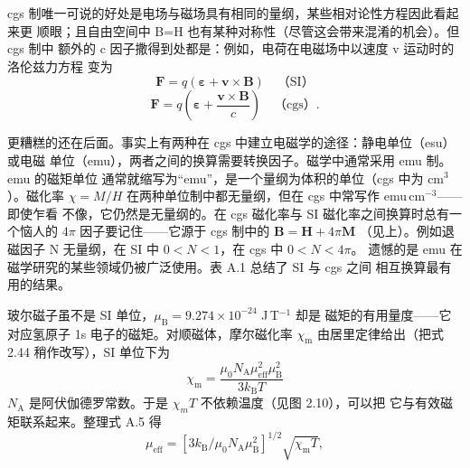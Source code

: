cgs 制唯一可说的好处是电场与磁场具有相同的量纲，某些相对论性方程因此看起来更
顺眼；且自由空间中 B=H 也有某种对称性（尽管这会带来混淆的机会）。但 cgs 制中
额外的 c 因子撒得到处都是：例如，电荷在电磁场中以速度 v 运动时的洛伦兹力方程
变为
\begin{equation*}
\mathbf{F} = q(\boldsymbol{\varepsilon} + \mathbf{v}\times\mathbf{B}) \quad\text{（SI）}
\end{equation*}
\begin{equation*}
\mathbf{F} = q\left(\boldsymbol{\varepsilon} + \frac{\mathbf{v}\times\mathbf{B}}{c}\right) \quad\text{（cgs）}.\tag{A.4}
\end{equation*}

更糟糕的还在后面。事实上有两种在 cgs 中建立电磁学的途径：静电单位（esu）或电磁
单位（emu），两者之间的换算需要转换因子。磁学中通常采用 emu 制。emu 的磁矩单位
通常就缩写为“emu”，是一个量纲为体积的单位（cgs 中为 cm$^{3}$）。磁化率
$\chi=M/H$ 在两种单位制中都无量纲，但在 cgs 中常写作 emu\,cm$^{-3}$——即使乍看
不像，它仍然是无量纲的。在 cgs 磁化率与 SI 磁化率之间换算时总有一个恼人的
$4\pi$ 因子要记住——它源于 cgs 制中的 $\mathbf{B}=\mathbf{H}+4\pi\mathbf{M}$
（见上）。例如退磁因子 N 无量纲，在 SI 中 $0<N<1$，在 cgs 中 $0<N<4\pi$。
遗憾的是 emu 在磁学研究的某些领域仍被广泛使用。表 A.1 总结了 SI 与 cgs 之间
相互换算最有用的结果。

玻尔磁子虽不是 SI 单位，$\mu_{\mathrm{B}}=9.274\times10^{-24}$ J\,T$^{-1}$ 却是
磁矩的有用量度——它对应氢原子 1s 电子的磁矩。对顺磁体，摩尔磁化率 $\chi_{\mathrm{m}}$
由居里定律给出（把式 2.44 稍作改写），SI 单位下为
\begin{equation*}
\chi_{\mathrm{m}} = \frac{\mu_0N_{\mathrm{A}}\mu_{\mathrm{eff}}^{2}\mu_{\mathrm{B}}^{2}}{3k_{\mathrm{B}}T}\tag{A.5}
\end{equation*}
$N_{\mathrm{A}}$ 是阿伏伽德罗常数。于是 $\chi_m T$ 不依赖温度（见图 2.10），可以把
它与有效磁矩联系起来。整理式 A.5 得
\begin{equation*}
\mu_{\mathrm{eff}} = \left[3k_{\mathrm{B}}/\mu_0N_{\mathrm{A}}\mu_{\mathrm{B}}^{2}\right]^{1/2}\sqrt{\chi_{\mathrm{m}}T},\tag{A.6}
\end{equation*}

